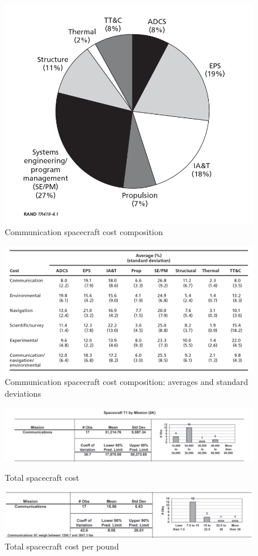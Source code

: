 \documentclass[11pt,a4paper,titlepage]{article}
\begin{document}
\begin{figure}
\centering
\includegraphics[width = .7\textwidth]{Torta.png}
\caption{Communication spacecraft cost composition}
\label{fig:torta}
\end{figure}

\begin{figure}
\centering
\includegraphics[width = 1\textwidth]{Standard_dev.png}
\caption{Communication spacecraft cost composition: averages and standard deviations}
\label{fig:distribution}
\end{figure}

\begin{figure}
\centering
\begin{minipage}{1\textwidth}
\centering
\includegraphics[width = .95\textwidth]{mission.png}
\caption{Total spacecraft cost}
\label{fig:mission}
\end{minipage}
\hspace{20mm}
\begin{minipage}{.95\textwidth}
\centering
\includegraphics[width = .95\textwidth]{mission_pound.png}
\caption{Total spacecraft cost per pound}
\label{fig:mission_pound}
\end{minipage}
\end{figure}
\end{document}
